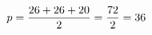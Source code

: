 \documentclass[preview]{standalone}
\begin{document}
\begin{align*}
\special{dvisvgm:raw <g id='unique000'>}p = \frac{26+26+20}{2} = \frac{72}{2} = 36\special{dvisvgm:raw </g>}
\end{align*}
\end{document}
